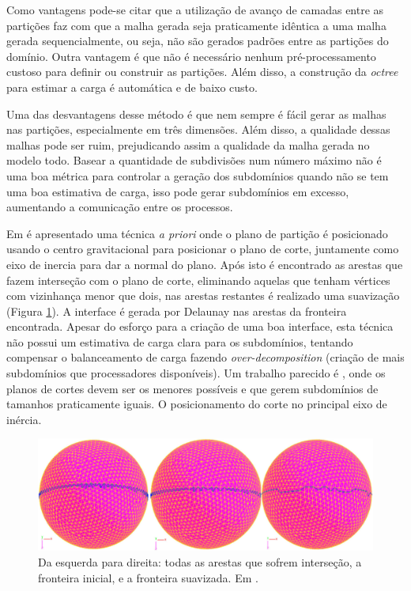 Como vantagens pode-se citar que a utilização de avanço de camadas entre as partições faz com que a malha gerada seja praticamente idêntica a uma malha gerada sequencialmente, ou seja, não são gerados padrões entre as partições do domínio. Outra vantagem é que não é necessário nenhum pré-processamento custoso para definir ou construir as partições. Além disso, a construção da \textit{octree} para estimar a carga é automática e de baixo custo.

Uma das desvantagens desse método é que nem sempre é fácil gerar as malhas nas partições, especialmente em três dimensões. Além disso, a qualidade dessas malhas pode ser ruim, prejudicando assim a qualidade da malha gerada no modelo todo. Basear a quantidade de subdivisões num número máximo não é uma boa métrica para controlar a geração dos subdomínios quando não se tem uma boa estimativa de carga, isso pode gerar subdomínios em excesso, aumentando a comunicação entre os processos. 
 
 
Em \cite{bib:CHEN12} é apresentado uma técnica \textit{a priori} onde o plano de partição é posicionado usando o centro gravitacional para posicionar o plano de corte, juntamente como eixo de inercia para dar a normal do plano. Após isto é encontrado as arestas que fazem interseção com o plano de corte, eliminando aquelas que tenham vértices com vizinhança menor que dois, nas arestas restantes é realizado uma suavização (Figura \ref{fig:chen}). A interface é gerada por Delaunay nas arestas da fronteira encontrada. Apesar do esforço para a criação de uma boa interface, esta técnica não possui um estimativa de carga clara para os subdomínios, tentando compensar o balanceamento de carga fazendo \textit{over-decomposition} (criação de mais subdomínios que processadores disponíveis). Um trabalho parecido é \cite{bib:ZHENG09}, onde os planos de cortes devem ser os menores possíveis e que gerem subdomínios de tamanhos praticamente iguais. O posicionamento do corte no principal eixo de inércia.


 \begin{figure}[htbp]
     \centering
     \includegraphics[width=1.0\textwidth]{fig/chen.png}
     \caption{Da esquerda para direita: todas as arestas que sofrem interseção, a fronteira inicial, e a fronteira suavizada. Em \cite{bib:CHEN12}.}
     \label{fig:chen}
 \end{figure}
 
